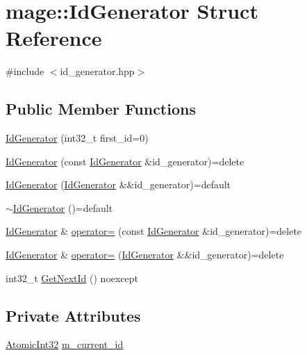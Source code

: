 \hypertarget{structmage_1_1_id_generator}{}\section{mage\+:\+:Id\+Generator Struct Reference}
\label{structmage_1_1_id_generator}


{\ttfamily \#include $<$id\+\_\+generator.\+hpp$>$}

\subsection*{Public Member Functions}
\begin{DoxyCompactItemize}
\item 
\hyperlink{structmage_1_1_id_generator_a10fccba8287b8e7ace574b690a197561}{Id\+Generator} (int32\+\_\+t first\+\_\+id=0)
\item 
\hyperlink{structmage_1_1_id_generator_a6f502d2cd8b63e7c76f31834b028a11d}{Id\+Generator} (const \hyperlink{structmage_1_1_id_generator}{Id\+Generator} \&id\+\_\+generator)=delete
\item 
\hyperlink{structmage_1_1_id_generator_a0ee69053c6cdb9f79a5857e65ebd2b6a}{Id\+Generator} (\hyperlink{structmage_1_1_id_generator}{Id\+Generator} \&\&id\+\_\+generator)=default
\item 
\hyperlink{structmage_1_1_id_generator_a70161ab5b10294ebba1ace7a3b0f8d31}{$\sim$\+Id\+Generator} ()=default
\item 
\hyperlink{structmage_1_1_id_generator}{Id\+Generator} \& \hyperlink{structmage_1_1_id_generator_a370c8289f38a534006e8b9ca7ec78026}{operator=} (const \hyperlink{structmage_1_1_id_generator}{Id\+Generator} \&id\+\_\+generator)=delete
\item 
\hyperlink{structmage_1_1_id_generator}{Id\+Generator} \& \hyperlink{structmage_1_1_id_generator_aace8082947445d26d2421ba8b361f1bc}{operator=} (\hyperlink{structmage_1_1_id_generator}{Id\+Generator} \&\&id\+\_\+generator)=delete
\item 
int32\+\_\+t \hyperlink{structmage_1_1_id_generator_a5125f4a4e928ae9bfcf71efce3789aa8}{Get\+Next\+Id} () noexcept
\end{DoxyCompactItemize}
\subsection*{Private Attributes}
\begin{DoxyCompactItemize}
\item 
\hyperlink{namespacemage_a37ac3b8da2d89495d105e00f1022cb1e}{Atomic\+Int32} \hyperlink{structmage_1_1_id_generator_ab094c8e57444d4fa02d5f3c2a5ea25f3}{m\+\_\+current\+\_\+id}
\end{DoxyCompactItemize}


